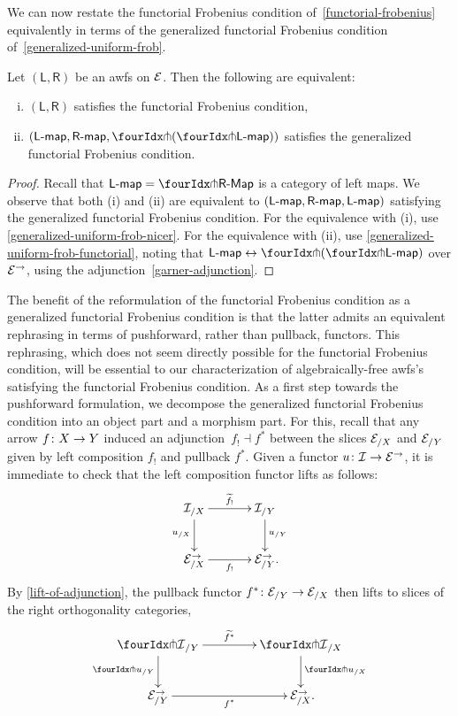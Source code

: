 \documentclass[reqno,10pt,a4paper,oneside,draft]{amsart}
\newcommand{\LL}{\mathsf{L}}
\newcommand{\RR}{\mathsf{R}}
\begin{document}
{{We can now restate the functorial Frobenius condition of~\cref{functorial-frobenius} equivalently in terms of the generalized functorial Frobenius condition of~\cref{generalized-uniform-frob}.

\begin{proposition}
Let $(\mathsf{L}, \mathsf{R})$ be an awfs on $\cal{E}$.
Then the following are equivalent:
\begin{enumerate}[(i)]
\item $(\LL, \RR)$ satisfies the functorial Frobenius condition,
\item $(\pcoalg{\LL}, \palg{\RR}, \liftl{(\liftr{\pcoalg{\LL}})})$ satisfies the generalized functorial Frobenius condition.
\end{enumerate}
\end{proposition}

\begin{proof}
Recall that $\pcoalg{\LL} = \liftl{\pAlg{\RR}}$ is a category of left maps.
We observe that both (i) and (ii) are equivalent to $(\pcoalg{\LL}, \palg{\RR}, \pcoalg{\LL})$ satisfying the generalized functorial Frobenius condition.
For the equivalence with (i), use \cref{generalized-uniform-frob-nicer}.
For the equivalence with (ii), use \cref{generalized-uniform-frob-functorial}, noting that
$\pcoalg{\LL} \leftrightarrow \liftl{(\liftr{\pcoalg{\LL}})}$ over $\cal{E}^\to$, using the adjunction~\eqref{garner-adjunction}.
\end{proof}

The benefit of the reformulation of the functorial Frobenius condition as a generalized functorial Frobenius condition is that the latter admits an equivalent rephrasing in terms of pushforward, rather than pullback, functors.
This rephrasing, which does not seem directly possible for the functorial Frobenius condition, will be essential to our characterization of algebraically-free awfs's satisfying the functorial Frobenius condition.
As a first step towards the pushforward formulation, we decompose the generalized functorial Frobenius condition into an object part and a morphism part.
For this, recall that any arrow $f \co X \to Y$ induced an adjunction~$f_{!} \dashv f^*$ between the slices $\cal{E}_{/X}$ and $\cal{E}_{/Y}$ given by left composition $f_{!}$ and pullback $f^*$.
Given a functor $u \co \cal{I} \to \catE^\to$, it is immediate to check that the left composition functor lifts as follows:
\[
\xymatrix@C+1em{
  \cal{I}_{/X}
  \ar[r]^-{\widetilde{f_!}}
  \ar[d]_{u_{/X}}
&
  \cal{I}_{/Y}
  \ar[d]^{u_{/Y}}
\\
  \calE_{/X}^\to
  \ar[r]_-{f_!}
&
  \calE_{/Y}^\to
\rlap{.}}
\]
By \cref{lift-of-adjunction}, the pullback functor $f^* \co \catE_{/Y} \to \catE_{/X}$ then lifts to slices of the right orthogonality categories,
\[
\xymatrix@C=1.5cm{
  \liftr{\cal{I}}_{/Y}
  \ar[d]_{{\liftr{u}}_{/Y}}
  \ar[r]^{\widetilde{f^*}}
&
  \liftr{\cal{I}}_{/X}
  \ar[d]^{{\liftr{u}}_{/X}}
\\
  {\catE}_{/Y}^\to
  \ar[r]_{f^*}
&
  \catE_{/X}^\to
\rlap{.}}
\]

}}
\end{document}
